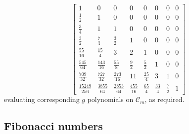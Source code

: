 \begin{displaymath}
\left[\begin{matrix}1 & 0 & 0 & 0 & 0 & 0 & 0 & 0\\\frac{1}{2} & 1 & 0 & 0 & 0 & 0 & 0 & 0\\\frac{3}{4} & 1 & 1 & 0 & 0 & 0 & 0 & 0\\\frac{3}{2} & \frac{7}{4} & \frac{3}{2} & 1 & 0 & 0 & 0 & 0\\\frac{55}{16} & \frac{15}{4} & 3 & 2 & 1 & 0 & 0 & 0\\\frac{545}{64} & \frac{143}{16} & \frac{55}{8} & \frac{9}{2} & \frac{5}{2} & 1 & 0 & 0\\\frac{709}{32} & \frac{727}{32} & \frac{273}{16} & 11 & \frac{25}{4} & 3 & 1 & 0\\\frac{15249}{256} & \frac{3855}{64} & \frac{2853}{64} & \frac{455}{16} & \frac{65}{4} & \frac{33}{4} & \frac{7}{2} & 1\end{matrix}\right]
\end{displaymath}
evaluating corresponding $g$ polynomials on $\mathcal{C}_{m}$, as required.

\subsection{Fibonacci numbers}

